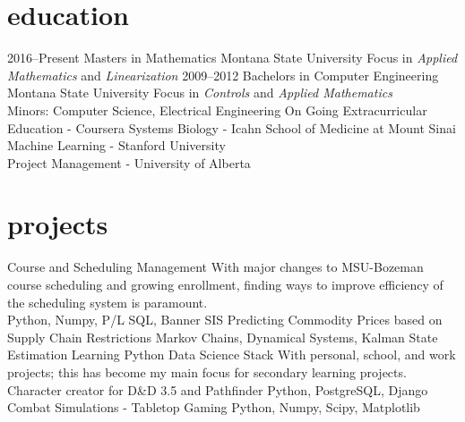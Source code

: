 \documentclass[]{two-column-stats} %
\begin{document}

\section{education}

\begin{entrylist}
\entry
{2016--Present}
{Masters {\normalfont in Mathematics}}
{Montana State University}
{Focus in \emph{Applied Mathematics} and \emph{Linearization}}
\entry
{2009--2012}
{Bachelors {\normalfont in Computer Engineering}}
{Montana State University}
{Focus in \emph{Controls} and \emph{Applied Mathematics} \\
 Minors: Computer Science, Electrical Engineering}
\thinentry
{On Going}
{Extracurricular Education - Coursera}
{Systems Biology - Icahn School of Medicine at Mount Sinai \\
 Machine Learning - Stanford University \\
 Project Management - University of Alberta}
\end{entrylist}

\section{projects}

\begin{entrylist}
\wideentry
{Course and Scheduling Management}
{With major changes to MSU-Bozeman course scheduling and growing enrollment, finding ways to improve efficiency of the scheduling system is paramount. \\
Python, Numpy, P/L SQL, Banner SIS}
\wideentry
{Predicting Commodity Prices based on Supply Chain Restrictions}
{Markov Chains, Dynamical Systems, Kalman State Estimation}
\wideentry
{Learning Python Data Science Stack}
{With personal, school, and work projects; this has become my main focus for secondary learning projects.}
\wideentry
{Character creator for D\&D 3.5 and Pathfinder}
{Python, PostgreSQL, Django}
\wideentry
{Combat Simulations - Tabletop Gaming}
{Python, Numpy, Scipy, Matplotlib}
\end{entrylist}
\end{document}
